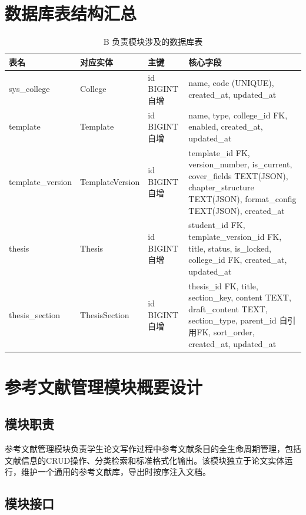 \documentclass{../../softeng}
\begin{document}
\section{数据库表结构汇总}

\begin{table}[htbp]
\centering
\caption{B 负责模块涉及的数据库表}
\begin{tabular}{lllp{7cm}}
\toprule
\textbf{表名} & \textbf{对应实体} & \textbf{主键} & \textbf{核心字段} \\
\midrule
sys\_college & College & id BIGINT 自增 & name, code (UNIQUE), created\_at, updated\_at \\
template & Template & id BIGINT 自增 & name, type, college\_id FK, enabled, created\_at, updated\_at \\
template\_version & TemplateVersion & id BIGINT 自增 & template\_id FK, version\_number, is\_current, cover\_fields TEXT(JSON), chapter\_structure TEXT(JSON), format\_config TEXT(JSON), created\_at \\
thesis & Thesis & id BIGINT 自增 & student\_id FK, template\_version\_id FK, title, status, is\_locked, college\_id FK, created\_at, updated\_at \\
thesis\_section & ThesisSection & id BIGINT 自增 & thesis\_id FK, title, section\_key, content TEXT, draft\_content TEXT, section\_type, parent\_id 自引用FK, sort\_order, created\_at, updated\_at \\
\bottomrule
\end{tabular}
\end{table}

\section{参考文献管理模块概要设计}

\subsection{模块职责}

参考文献管理模块负责学生论文写作过程中参考文献条目的全生命周期管理，包括文献信息的CRUD操作、分类检索和标准格式化输出。该模块独立于论文实体运行，维护一个通用的参考文献库，导出时按序注入文档。

\subsection{模块接口}
\end{document}

